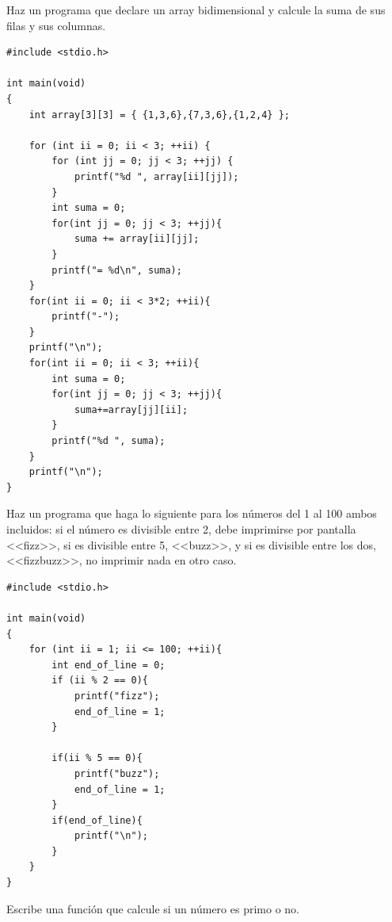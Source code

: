 \documentclass[a4paper]{article}
\begin{document}
\begin{exercises}
\item Haz un programa que declare un array bidimensional y calcule la suma de
sus filas y sus columnas.


\noindent
\begin{minipage}[H]{\linewidth}
\mbox{}
\begin{lstlisting}[style=C,
caption={Solución al ejercicio 3},
label={lst:solution3}]
#include <stdio.h>

int main(void)
{
    int array[3][3] = { {1,3,6},{7,3,6},{1,2,4} };

    for (int ii = 0; ii < 3; ++ii) {
        for (int jj = 0; jj < 3; ++jj) {
            printf("%d ", array[ii][jj]);
        }
        int suma = 0;
        for(int jj = 0; jj < 3; ++jj){
            suma += array[ii][jj];
        }
        printf("= %d\n", suma);
    }
    for(int ii = 0; ii < 3*2; ++ii){
        printf("-");
    }
    printf("\n");
    for(int ii = 0; ii < 3; ++ii){
        int suma = 0;
        for(int jj = 0; jj < 3; ++jj){
            suma+=array[jj][ii];
        }
        printf("%d ", suma);
    }
    printf("\n");
}

\end{lstlisting}
\end{minipage}


\item Haz un programa que haga lo siguiente para los números del 1 al 100 ambos
incluidos: si el número es divisible entre 2, debe imprimirse por pantalla
<<fizz>>, si es divisible entre 5, <<buzz>>, y si es divisible entre los dos,
<<fizzbuzz>>, no imprimir nada en otro caso.


\noindent
\begin{minipage}[H]{\linewidth}
\mbox{}
\begin{lstlisting}[style=C,
caption={Solución al ejercicio 4},
label={lst:solution4}]
#include <stdio.h>

int main(void)
{
    for (int ii = 1; ii <= 100; ++ii){
        int end_of_line = 0;
        if (ii % 2 == 0){
            printf("fizz");
            end_of_line = 1;
        }

        if(ii % 5 == 0){
            printf("buzz");
            end_of_line = 1;
        }
        if(end_of_line){
            printf("\n");
        }
    }
}
\end{lstlisting}
\end{minipage}

\item Escribe una función que calcule si un número es primo o no.



\end{exercises}
\end{document}
